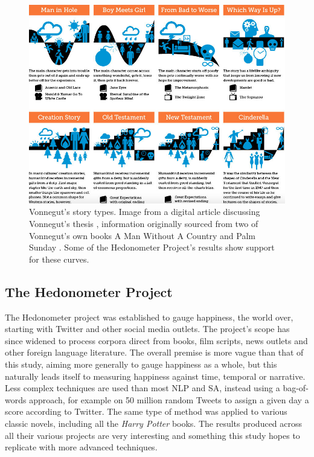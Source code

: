 \documentclass{article}
\begin{document}
{\begin{figure}[htbp]
            \includegraphics[width=1\textwidth]{Figures/Misc/VonnegutShapes}
            \caption{Vonnegut's story types. Image from a digital article discussing Vonnegut's thesis \citep{vonnegutThesis}, information originally sourced from two of Vonnegut's own books \textup{A Man Without A Country} \citep{vonnegut_simon_2007} and \textup{Palm Sunday} \citep{vonnegut_1981}. Some of the Hedonometer Project's results show support for these curves.}
            \label{fig:storyTypes}
        \end{figure}
        
    \subsection{The Hedonometer Project}
    \label{subsec:hedonometer}
        The Hedonometer project was established to gauge happiness, the world over, starting with Twitter and other social media outlets. The project’s scope has since widened to process corpora direct from books, film scripts, news outlets and other foreign language literature. The overall premise is more vague than that of this study, aiming more generally to gauge happiness as a whole, but this naturally leads itself to measuring happiness against time, temporal or narrative. 
        Less complex techniques are used than most NLP and SA, instead using a bag-of-words approach, for example on 50 million random Tweets to assign a given day a score according to Twitter. The same type of method was applied to various classic novels, including all the \textit{Harry Potter} books. The results produced across all their various projects are very interesting and something this study hopes to replicate with more advanced techniques.
\newpage
}
\end{document}
